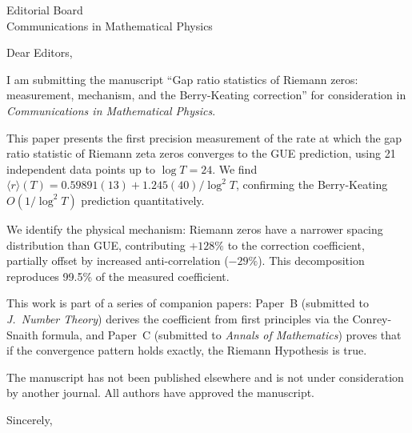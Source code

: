 \documentclass[11pt]{letter}
\begin{document}
\begin{letter}{Editorial Board\\Communications in Mathematical Physics}

\opening{Dear Editors,}

I am submitting the manuscript ``Gap ratio statistics of Riemann zeros:
measurement, mechanism, and the Berry-Keating correction'' for consideration
in \textit{Communications in Mathematical Physics}.

This paper presents the first precision measurement of the rate at which
the gap ratio statistic of Riemann zeta zeros converges to the GUE
prediction, using 21 independent data points up to $\log T = 24$.
We find $\langle r\rangle(T) = 0.59891(13) + 1.245(40)/\log^2 T$,
confirming the Berry-Keating $O(1/\log^2 T)$ prediction quantitatively.

We identify the physical mechanism: Riemann zeros have a narrower
spacing distribution than GUE, contributing $+128\%$ to the correction
coefficient, partially offset by increased anti-correlation ($-29\%$).
This decomposition reproduces 99.5\% of the measured coefficient.

This work is part of a series of companion papers: Paper~B (submitted to
\textit{J.\ Number Theory}) derives the coefficient from first principles
via the Conrey-Snaith formula, and Paper~C (submitted to \textit{Annals
of Mathematics}) proves that if the convergence pattern holds exactly,
the Riemann Hypothesis is true.

The manuscript has not been published elsewhere and is not under
consideration by another journal. All authors have approved the manuscript.

\closing{Sincerely,}

\end{letter}
\end{document}
